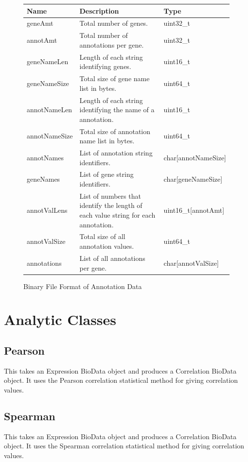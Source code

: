 \documentclass[10pt]{article}
\begin{document}
\begin{figure}[H]
\begin{mdframed}[style=btable]
\begin{tabularx}{\textwidth}{|l|X|l|}
\hline
\textbf{Name} & \textbf{Description} & \textbf{Type} \\
\hline
geneAmt & Total number of genes. & uint32\_t \\
\hline
annotAmt & Total number of annotations per gene. & uint32\_t \\
\hline
geneNameLen & Length of each string identifying genes. & uint16\_t \\
\hline
geneNameSize & Total size of gene name list in bytes. & uint64\_t \\
\hline
annotNameLen & Length of each string identifying the name of a annotation. & 
uint16\_t \\
\hline
annotNameSize & Total size of annotation name list in bytes. & uint64\_t \\
\hline
annotNames & List of annotation string identifiers. & char[annotNameSize] \\
\hline
geneNames & List of gene string identifiers. & char[geneNameSize] \\
\hline
annotValLens & List of numbers that identify the length of each value string 
for each annotation. & uint16\_t[annotAmt] \\
\hline
annotValSize & Total size of all annotation values. & uint64\_t \\
\hline
annotations & List of all annotations per gene. & char[annotValSize] \\
\hline
\end{tabularx}
\end{mdframed}
\caption{Binary File Format of Annotation Data}
\label{fig:annotation}
\end{figure}

\newpage
\section{Analytic Classes}

\subsection{Pearson}

This takes an Expression BioData object and produces a Correlation BioData 
object. It uses the Pearson correlation statistical method for giving 
correlation values.

\subsection{Spearman}

This takes an Expression BioData object and produces a Correlation BioData 
object. It uses the Spearman correlation statistical method for giving 
correlation values.
\end{document}
